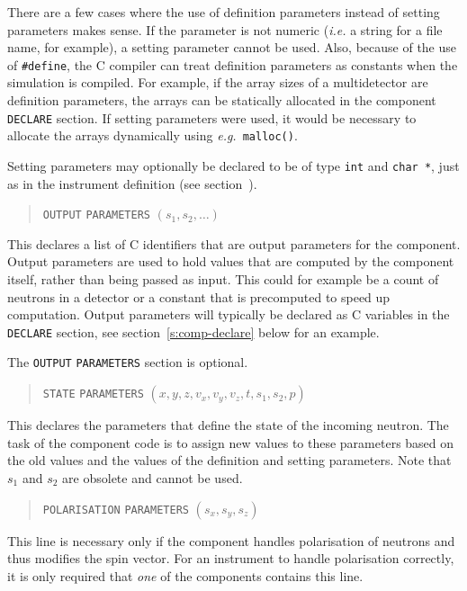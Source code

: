 {There are a few cases where the use of definition parameters instead of
setting parameters makes sense. If the parameter is not numeric ({\em i.e.} a
string for a file name, for example), a setting parameter cannot be
used. Also, because of the use of \verb+#define+, the C compiler can
treat definition parameters as constants when the simulation is
compiled. For example, if the array sizes of a multidetector are
definition parameters, the arrays can be statically allocated in the
component \verb+DECLARE+ section. If setting parameters were used, it
would be necessary to allocate the arrays dynamically using {\em e.g.}\ 
\verb+malloc()+.

Setting parameters may optionally be declared to be of type \verb+int+ and \verb+char *+, just as in the instrument definition (see section~\label{s:instrdefs}).

\begin{quote}
  \texttt{OUTPUT} \texttt{PARAMETERS} $(s_1, s_2, \ldots)$
\end{quote}
This declares a list of C identifiers that are output parameters for the
component. Output parameters are used to hold values that are computed
by the component itself, rather than being passed as input. This could
for example be a count of neutrons in a detector or a constant that is
precomputed to speed up computation. Output
parameters will typically be declared as C variables in the
\texttt{DECLARE} section, see section~\ref{s:comp-declare} below for an
example.

The \texttt{OUTPUT} \texttt{PARAMETERS} section is optional.

\begin{quote}
  \texttt{STATE} \texttt{PARAMETERS} $(x,y,z,v_x,v_y,v_z,t,s_1,s_2,p)$
\end{quote}
This declares the parameters that define the state of the incoming
neutron. The task of the component code is to assign new values to these
parameters based on the old values and the values of the definition and
setting parameters. Note that $s_1$ and $s_2$ are obsolete and cannot be used.

\begin{quote}
  \texttt{POLARISATION} \texttt{PARAMETERS} $(s_x,s_y,s_z)$
\end{quote}
This line is necessary only if the component handles polarisation of neutrons
and thus modifies the spin vector. For an instrument to handle polarisation
correctly, it is only required that {\em one} of the components contains this
line.

}
